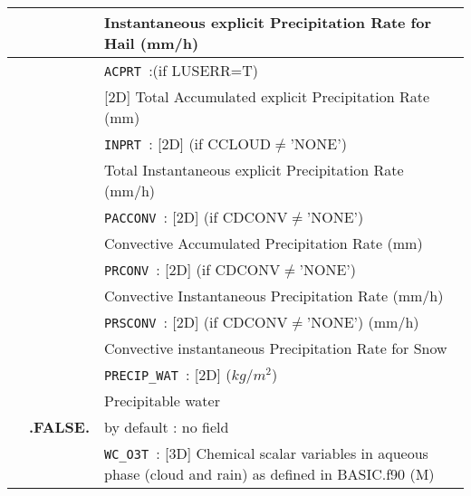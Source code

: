 \begin{center}
\begin{tabular}{|>{\centering}p{3cm}|>{\centering}p{2.5cm}|p{11cm}|}
&& Instantaneous explicit Precipitation Rate for Hail (mm/h) \\\cline{3-3}
& &{\tt ACPRT }:(if LUSERR=T)\\
&& [2D] Total Accumulated explicit Precipitation Rate (mm) \\\cline{3-3}
& &{\tt INPRT }: [2D] (if CCLOUD$\neq$'NONE')\\
&& Total Instantaneous explicit Precipitation Rate (mm/h) \\\cline{3-3}
& &{\tt PACCONV }: [2D] (if CDCONV$\neq$'NONE')\\
&&Convective Accumulated Precipitation Rate (mm)\\\cline{3-3}
& &{\tt PRCONV }: [2D] (if CDCONV$\neq$'NONE')\\
&& Convective Instantaneous Precipitation Rate (mm/h)\\\cline{3-3}
& &{\tt PRSCONV }: [2D] (if CDCONV$\neq$'NONE')  (mm/h) \\
&& Convective instantaneous Precipitation Rate for Snow  \\ \cline{3-3}
& &{\tt PRECIP\_WAT }: [2D]   ($kg/m^2$) \\
&&  Precipitable water \\ 
\hline
\multirow{3}{*}{LCHAQDIAG}\index{LCHAQDIAG!\innam{NAM\_DIAG}}&\textbf{.FALSE.} & by default : no field \\\cline{2-3}
&\multirow{2}{*}{.TRUE.} &{\tt WC\_O3T }: [3D] Chemical scalar variables in aqueous phase (cloud and rain) as defined in BASIC.f90 (M) \\
\hline
\end{tabular} 
\end{center}

